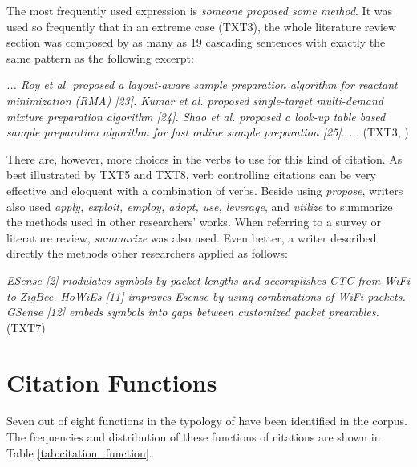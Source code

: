The most frequently used expression is \textit{someone proposed some method}. It was used so frequently that in an extreme case (TXT3), the whole literature review section was composed by as many as 19 cascading sentences with exactly the same pattern as the following excerpt:

\textit{... Roy et al. proposed a layout-aware sample preparation algorithm for reactant minimization (RMA) [23]. Kumar et al. proposed single-target multi-demand mixture preparation algorithm [24]. Shao et al. proposed a look-up table based sample preparation algorithm for fast online sample preparation [25]. ...} (TXT3, \citealp{ji_more_2018})

There are, however, more choices in the verbs to use for this kind of citation. As best illustrated by TXT5 and TXT8, verb controlling citations can be very effective and eloquent with a combination of verbs. Beside using \textit{propose}, writers also used \textit{apply, exploit, employ, adopt, use, leverage}, and \textit{utilize} to summarize the methods used in other researchers’ works. When referring to a survey or literature review, \textit{summarize} was also used. Even better, a writer described directly the methods other researchers applied as follows:

\textit{ESense [2] modulates symbols by packet lengths and accomplishes CTC from WiFi to ZigBee. HoWiEs [11] improves Esense by using combinations of WiFi packets. GSense [12] embeds symbols into gaps between customized packet preambles.} (TXT7)

\section{Citation Functions}
Seven out of eight functions in the typology of \citet{petric_rhetorical_2007} have been identified in the corpus. The frequencies and distribution of these functions of citations are shown in Table \ref{tab:citation_function}.


